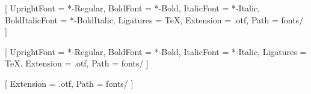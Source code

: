 \newcommand*{\mytitle}{Bachelor/Master thesis template}
\newcommand*{\mysubtitle}{Masterarbeit zur Erlangung des akademischen Grades Master of Science (M.\,Sc.) im Fach Physik}
\newcommand*{\mydegree}{M.Sc.}
\newcommand*{\myname}{Bastian Leykauf}
\newcommand*{\myprof}{Prof.~Dr.~Albert~Einstein}
\newcommand*{\myotherprof}{Prof.~Dr.~Paul~Dirac}
\newcommand*{\myfaculty}{Mathematisch-Naturwissenschaftliche Fakultät}
\newcommand*{\mydepartment}{Arbeitsgruppe Quantenoptische Metrologie}
\newcommand*{\myuniversity}{Humboldt-Universität zu Berlin}
\newcommand*{\mylocation}{Berlin}
\newcommand*{\mytime}{\today}

\usepackage{fontspec}

\usepackage{mathtools}
\usepackage[
    math-style=ISO,
    bold-style=ISO,
    partial=upright,
    nabla=upright
]{unicode-math}


\setmainfont{LibertinusSerif}[
    UprightFont    = *-Regular,
    BoldFont       = *-Bold,
    ItalicFont     = *-Italic,
    BoldItalicFont = *-BoldItalic,
    Ligatures      = TeX,
    Extension      = .otf,
    Path           = fonts/
]

\setsansfont{LibertinusSans}[
     UprightFont    = *-Regular,
     BoldFont       = *-Bold,
     ItalicFont     = *-Italic,
     Ligatures      = TeX,
     Extension      = .otf,
     Path           = fonts/
]

[
    Extension       = .otf,
    Path            = fonts/
]

\usepackage{microtype}                       	%
\usepackage{polyglossia}
\setdefaultlanguage{english}

\usepackage[hidelinks]{hyperref}
\usepackage{cleveref}

\usepackage{csquotes}        %
\usepackage[acronym, nomain, nonumberlist, nogroupskip, automake]{glossaries} %
\usepackage{glossary-mcols}

\makeglossaries

\usepackage[style=phys,
				biblabel=brackets,
				doi=true,
				url=true,
				giveninits=true,
				hyperref,
				eprint=true,
				backend=biber]{biblatex}



\usepackage{tabularx}
\usepackage{booktabs}                                         %
\usepackage[normal]{threeparttable}         		       	%
    \usepackage{etoolbox}                                       %
      \robustify\tnote                                          %
\usepackage{longtable}
\usepackage{caption}
\setcapindent{1em}
\usepackage{url}                    %
\usepackage{graphicx}
\graphicspath{ {graphics/}}

